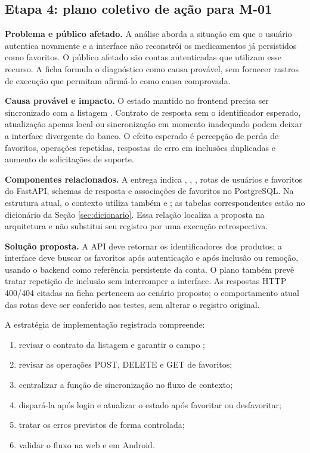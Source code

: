 \subsection{Etapa 4: plano coletivo de ação para M-01}\label{sec:pratica02_plano}

\textbf{Problema e público afetado.} A análise aborda a situação em que o usuário autentica novamente e a interface não reconstrói os medicamentos já persistidos como favoritos. O público afetado são contas autenticadas que utilizam esse recurso. A ficha formula o diagnóstico como causa provável, sem fornecer rastros de execução que permitam afirmá-lo como causa comprovada.

\textbf{Causa provável e impacto.} O estado  mantido no frontend precisa ser sincronizado com a listagem . Contrato de resposta sem o identificador esperado, atualização apenas local ou sincronização em momento inadequado podem deixar a interface divergente do banco. O efeito esperado é percepção de perda de favoritos, operações repetidas, respostas de erro em inclusões duplicadas e aumento de solicitações de suporte.

\textbf{Componentes relacionados.} A entrega indica , , , rotas de usuários e favoritos do FastAPI, schemas de resposta e associações de favoritos no PostgreSQL. Na estrutura atual, o contexto utiliza também  e ; as tabelas correspondentes estão no dicionário da Seção \ref{sec:dicionario}. Essa relação localiza a proposta na arquitetura e não substitui seu registro por uma execução retrospectiva.

\textbf{Solução proposta.} A API deve retornar os identificadores dos produtos; a interface deve buscar os favoritos após autenticação e após inclusão ou remoção, usando o backend como referência persistente da conta. O plano também prevê tratar repetição de inclusão sem interromper a interface. As respostas HTTP 400/404 citadas na ficha pertencem ao cenário proposto; o comportamento atual das rotas deve ser conferido nos testes, sem alterar o registro original.

A estratégia de implementação registrada compreende:
\begin{enumerate}
\item revisar o contrato da listagem e garantir o campo ;
\item revisar as operações POST, DELETE e GET de favoritos;
\item centralizar a função de sincronização no fluxo de contexto;
\item dispará-la após login e atualizar o estado após favoritar ou desfavoritar;
\item tratar os erros previstos de forma controlada;
\item validar o fluxo na web e em Android.
\end{enumerate}

